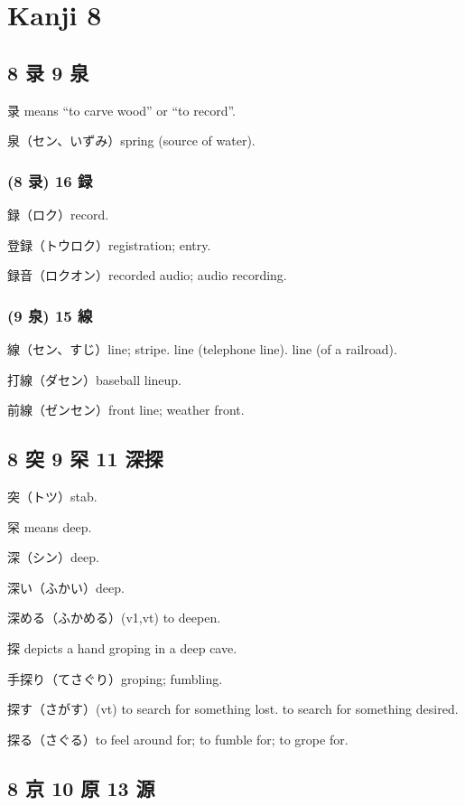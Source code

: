 \chapter{Kanji 8}

\section{8 录 9 泉}

录 means ``to carve wood'' or ``to record''.

泉（セン、いずみ）spring (source of water).

\subsection{(8 录) 16 録}

録（ロク）record.

登録（トウロク）registration; entry.

録音（ロクオン）recorded audio; audio recording.

\subsection{(9 泉) 15 線}

線（セン、すじ）line; stripe.
line (telephone line).
line (of a railroad).

打線（ダセン）baseball lineup.

前線（ゼンセン）front line; weather front.

\section{8 突 9 罙 11 深探}

突（トツ）stab.

罙 means deep.

深（シン）deep.

深い（ふかい）deep.

深める（ふかめる）(v1,vt) to deepen.

探 depicts a hand groping in a deep cave.

手探り（てさぐり）groping; fumbling.

探す（さがす）(vt)
to search for something lost.
to search for something desired.

探る（さぐる）to feel around for; to fumble for; to grope for.

\section{8 京 10 原 13 源}

